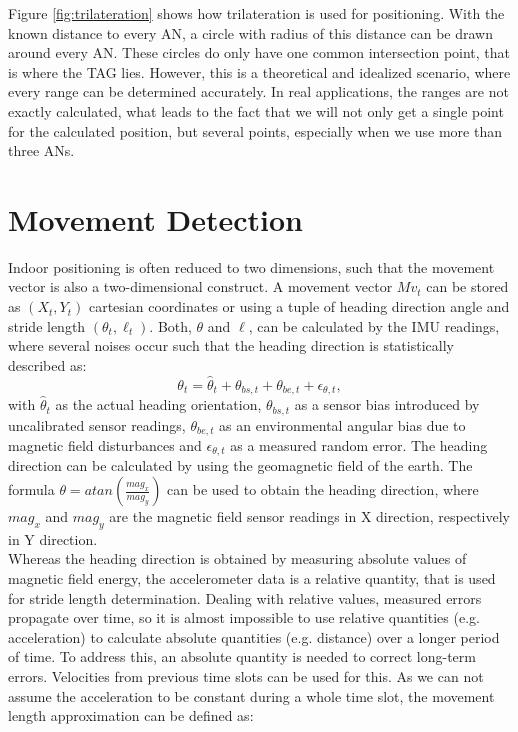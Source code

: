Figure \ref{fig:trilateration} shows how trilateration is used for positioning. With the known distance to every AN, a circle with radius of this distance can be drawn around every AN. These circles do only have one common intersection point, that is where the TAG lies. However, this is a theoretical and idealized scenario, where every range can be determined accurately. In real applications, the ranges are not exactly calculated, what leads to the fact that we will not only get a single point for the calculated position, but several points, especially when we use more than three ANs.

\section{Movement Detection}
Indoor positioning is often reduced to two dimensions, such that the movement vector is also a two-dimensional construct. A movement vector $Mv_{t}$ can be stored as $(X_{t}, Y_{t})$ cartesian coordinates or using a tuple of heading direction angle and stride length $(\theta_{t}, \ell_{t})$. Both, $\theta$ and $\ell$, can be calculated by the IMU readings, where several noises occur such that the heading direction is statistically described as:
\begin{equation}
\theta_{t} = \hat{\theta}_{t} + \theta_{bs,t} + \theta_{be,t} + \epsilon_{\theta, t},
\label{eqn:heading_direction}
\end{equation}
with $\hat{\theta}_{t}$ as the actual heading orientation,  $\theta_{bs,t}$ as a sensor bias introduced by uncalibrated sensor readings, $\theta_{be,t}$ as an environmental angular bias due to magnetic field disturbances and $\epsilon_{\theta, t}$ as a measured random error. The heading direction can be calculated by using the geomagnetic field of the earth. The formula $\theta = atan(\frac{mag_{x}}{mag_{y}})$ can be used to obtain the heading direction, where $mag_{x}$ and $mag_{y}$ are the magnetic field sensor readings in X direction, respectively in Y direction.\\
\noindent\hspace*{5mm}%
Whereas the heading direction is obtained by measuring absolute values of magnetic field energy, the accelerometer data is a relative quantity, that is used for stride length determination. Dealing with relative values, measured errors propagate over time, so it is almost impossible to use relative quantities (e.g. acceleration) to calculate absolute quantities (e.g. distance) over a longer period of time. To address this, an absolute quantity is needed to correct long-term errors. Velocities from previous time slots can be used for this. As we can not assume the acceleration to be constant during a whole time slot, the movement length approximation can be defined as: 

